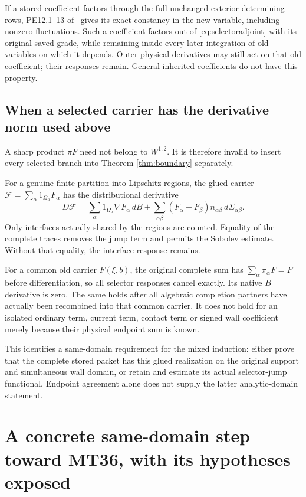 \documentclass[11pt,letterpaper]{article}
\theoremstyle{remark}\newtheorem{remark}[theorem]{Remark}
\begin{document}
If a stored coefficient factors through the full unchanged exterior determining rows, PE12.1--13 of~\cite[pp.~1174--1177]{W} gives its exact constancy in the new variable, including nonzero fluctuations. Such a coefficient factors out of \eqref{eq:selectoradjoint} with its original saved grade, while remaining inside every later integration of old variables on which it depends. Outer physical derivatives may still act on that old coefficient; their responses remain. General inherited coefficients do not have this property.

\subsection{When a selected carrier has the derivative norm used above}

A sharp product $\pi F$ need not belong to $W^{1,2}$. It is therefore invalid to insert every selected branch into Theorem \ref{thm:boundary} separately.

For a genuine finite partition into Lipschitz regions, the glued carrier
$\mathcal F=\sum_\alpha1_{\Omega_\alpha}F_\alpha$ has the distributional derivative
\[
 D\mathcal F
 =\sum_\alpha1_{\Omega_\alpha}\nabla F_\alpha\,dB
   +\sum_{\alpha\beta}
      (F_\alpha-F_\beta)n_{\alpha\beta}\,d\Sigma_{\alpha\beta}.
\]
Only interfaces actually shared by the regions are counted. Equality of the complete traces removes the jump term and permits the Sobolev estimate. Without that equality, the interface response remains.

For a common old carrier $F(\xi,b)$, the original complete sum has
$\sum_\alpha\pi_\alpha F=F$ before differentiation, so all selector responses cancel exactly. Its native $B$ derivative is zero. The same holds after all algebraic completion partners have actually been recombined into that common carrier. It does not hold for an isolated ordinary term, current term, contact term or signed wall coefficient merely because their physical endpoint sum is known.

This identifies a same-domain requirement for the mixed induction: either prove that the complete stored packet has this glued realization on the original support and simultaneous wall domain, or retain and estimate its actual selector-jump functional. Endpoint agreement alone does not supply the latter analytic-domain statement.

\section{A concrete same-domain step toward MT36, with its hypotheses exposed}
\end{document}
